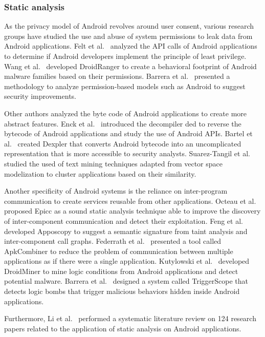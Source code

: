 \subsubsection{Static analysis}
As the privacy model of Android revolves around user consent, various research groups have studied the use and abuse of system permissions to leak data from Android applications.
Felt et al.~\cite{felt_android_2011} analyzed the API calls of Android applications to determine if Android developers implement the principle of least privilege.
Wang et al.~\cite{wang_hey_2012} developed DroidRanger to create a behavioral footprint of Android malware families based on their permissions.
Barrera et al.~\cite{barrera_methodology_2010} presented a methodology to analyze permission-based models such as Android to suggest security improvements.

Other authors analyzed the byte code of Android applications to create more abstract features.
Enck et al.~\cite{enck_study_2011} introduced the decompiler ded to reverse the bytecode of Android applications and study the use of Android APIs.
Bartel et al.~\cite{bartel_dexpler:_2012} created Dexpler that converts Android bytecode into an uncomplicated representation that is more accessible to security analysts.
Suarez-Tangil et al.~\cite{suarez-tangil_dendroid:_2014} studied the used of text mining techniques adapted from vector space modelization to cluster applications based on their similarity.

Another specificity of Android systems is the reliance on inter-program communication to create services reusable from other applications.
Octeau et al.~\cite{octeau_effective_2013} proposed Epicc as a sound static analysis technique able to improve the discovery of inter-component communication and detect their exploitation.
Feng et al.~\cite{feng_apposcopy:_2014} developed Apposcopy to suggest a semantic signature from taint analysis and inter-component call graphs.
Federrath et al.~\cite{federrath_apkcombiner:_2015} presented a tool called ApkCombiner to reduce the problem of communication between multiple applications as if there were a single application.
Kutylowski et al.~\cite{kutylowski_droidminer:_2014} developed DroidMiner to mine logic conditions from Android applications and detect potential malware.
Barrera et al.~\cite{fratantonio_triggerscope:_2016} designed a system called TriggerScope that detects logic bombs that trigger malicious behaviors hidden inside Android applications.

Furthermore, Li et al.~\cite{li_static_2017} performed a systematic literature review on 124 research papers related to the application of static analysis on Android applications.
